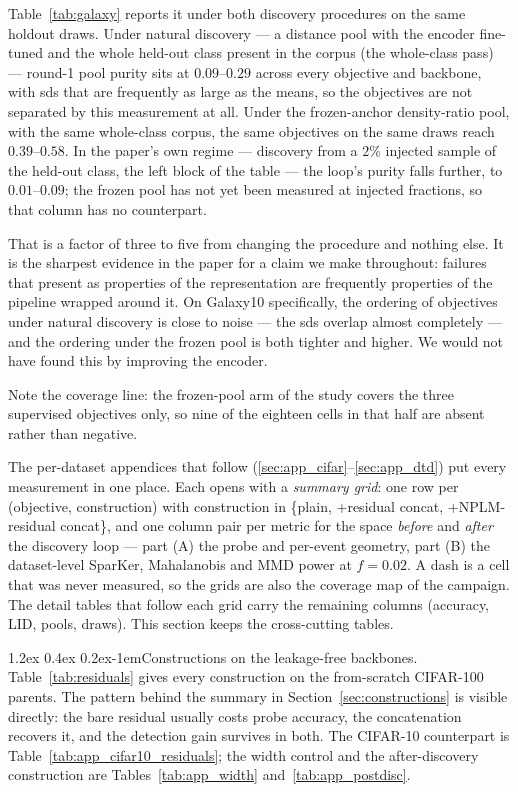 \documentclass{article}
\makeatletter
\renewcommand\paragraph{\@startsection{paragraph}{4}{\z@}%
  {1.2ex \@plus 0.4ex \@minus 0.2ex}{-1em}{\normalsize\bf}}
\makeatother
\begin{document}
Table~\ref{tab:galaxy} reports it under both discovery procedures on the same
holdout draws. Under natural discovery --- a distance pool with the encoder
fine-tuned and the whole held-out class present in the corpus (the whole-class pass) --- round-1 pool
purity sits at $0.09$--$0.29$ across every objective and backbone, with sds
that are frequently as large as the means, so the objectives are not separated
by this measurement at all. Under the frozen-anchor density-ratio pool, with
the same whole-class corpus, the same objectives on the same draws reach
$0.39$--$0.58$. In the paper's own regime --- discovery from a $2\%$ injected
sample of the held-out class, the left block of the table --- the loop's
purity falls further, to $0.01$--$0.09$; the frozen pool has not yet been
measured at injected fractions, so that column has no counterpart.

That is a factor of three to five from changing the procedure and nothing
else. It is the sharpest evidence in the paper for a claim we make throughout:
failures that present as properties of the representation are frequently
properties of the pipeline wrapped around it. On Galaxy10 specifically, the
ordering of objectives under natural discovery is close to noise --- the sds
overlap almost completely --- and the ordering under the frozen pool is both
tighter and higher. We would not have found this by improving the encoder.

Note the coverage line: the frozen-pool arm of the study covers the three
supervised objectives only, so nine of the eighteen cells in that half are
absent rather than negative.

The per-dataset appendices that follow (\ref{sec:app_cifar}--\ref{sec:app_dtd})
put every measurement in one place. Each opens with a \emph{summary grid}:
one row per (objective, construction) with construction in \{plain,
$+$residual concat, $+$NPLM-residual concat\}, and one column pair per metric
for the space \emph{before} and \emph{after} the discovery loop --- part (A)
the probe and per-event geometry, part (B) the dataset-level SparKer,
Mahalanobis and MMD power at $f{=}0.02$. A dash is a cell that was never
measured, so the grids are also the coverage map of the campaign. The detail
tables that follow each grid carry the remaining columns (accuracy, LID,
pools, draws). This section keeps the cross-cutting tables.

\paragraph{Constructions on the leakage-free backbones.}
Table~\ref{tab:residuals} gives every construction on the from-scratch
CIFAR-100 parents. The pattern behind the summary in
Section~\ref{sec:constructions} is visible directly: the bare residual usually
costs probe accuracy, the concatenation recovers it, and the detection gain
survives in both. The CIFAR-10 counterpart is
Table~\ref{tab:app_cifar10_residuals}; the width control and the
after-discovery construction are Tables~\ref{tab:app_width}
and~\ref{tab:app_postdisc}.
\end{document}
